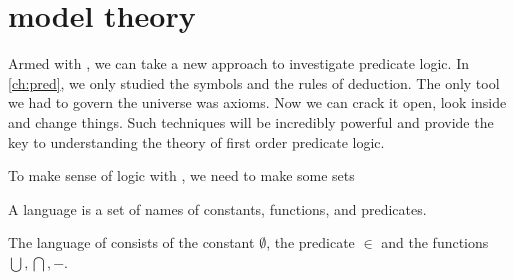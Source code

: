 \documentclass{scrbook}
\begin{document}
\chapter[Model theory]{model theory}
Armed with \zfc, we can take a new approach to investigate predicate logic. In \cref{ch:pred}, we only studied the symbols and the rules of deduction. The only tool we had to govern the universe was axioms. Now we can crack it open, look inside and change things. Such techniques will be incredibly powerful and provide the key to understanding the theory of first order predicate logic. 

To make sense of logic with \zfc, we need to make some sets
\begin{defn}[language]
  A language is a set of names of constants, functions, and predicates. 
\end{defn}
\begin{example}
  The language of \zfc consists of the constant $\emptyset$, the predicate $\in$ and the functions $\bigcup,\bigcap,-$. 
\end{example}
\end{document}
